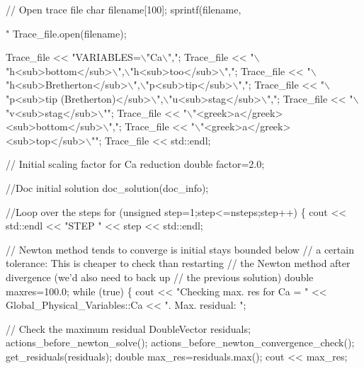 \begin{DoxyCodeInclude}
{{ \textcolor{comment}{// Open trace file}
 \textcolor{keywordtype}{char} filename[100];   
 sprintf(filename,\textcolor{stringliteral}{"%
 Trace\_file.open(filename);

 Trace\_file << \textcolor{stringliteral}{"VARIABLES=\(\backslash\)"Ca\(\backslash\)","};
 Trace\_file << \textcolor{stringliteral}{"\(\backslash\)"h<sub>bottom</sub>\(\backslash\)",\(\backslash\)"h<sub>too</sub>\(\backslash\)","};
 Trace\_file << \textcolor{stringliteral}{"\(\backslash\)"h<sub>Bretherton</sub>\(\backslash\)",\(\backslash\)"p<sub>tip</sub>\(\backslash\)","};
 Trace\_file << \textcolor{stringliteral}{"\(\backslash\)"p<sub>tip (Bretherton)</sub>\(\backslash\)",\(\backslash\)"u<sub>stag</sub>\(\backslash\)","};
 Trace\_file << \textcolor{stringliteral}{"\(\backslash\)"v<sub>stag</sub>\(\backslash\)""};
 Trace\_file << \textcolor{stringliteral}{"\(\backslash\)"<greek>a</greek><sub>bottom</sub>\(\backslash\)","};
 Trace\_file << \textcolor{stringliteral}{"\(\backslash\)"<greek>a</greek><sub>top</sub>\(\backslash\)""};
 Trace\_file << std::endl;

 \textcolor{comment}{// Initial scaling factor for Ca reduction}
 \textcolor{keywordtype}{double} factor=2.0;

 \textcolor{comment}{//Doc initial solution}
 doc\_solution(doc\_info);

\textcolor{comment}{//Loop over the steps}
 \textcolor{keywordflow}{for} (\textcolor{keywordtype}{unsigned} step=1;step<=nsteps;step++)
  \{
   cout << std::endl << \textcolor{stringliteral}{"STEP "} << step << std::endl;

   \textcolor{comment}{// Newton method tends to converge is initial stays bounded below}
   \textcolor{comment}{// a certain tolerance: This is cheaper to check than restarting}
   \textcolor{comment}{// the Newton method after divergence (we'd also need to back up}
   \textcolor{comment}{// the previous solution)}
   \textcolor{keywordtype}{double} maxres=100.0;
   \textcolor{keywordflow}{while} (\textcolor{keyword}{true})
    \{
     cout << \textcolor{stringliteral}{"Checking max. res for Ca = "} 
          << Global\_Physical\_Variables::Ca << \textcolor{stringliteral}{".   Max. residual: "};

     \textcolor{comment}{// Check the maximum residual}
     DoubleVector residuals;
     actions\_before\_newton\_solve();
     actions\_before\_newton\_convergence\_check();
     get\_residuals(residuals);
     \textcolor{keywordtype}{double} max\_res=residuals.max();
     cout << max\_res;

}}}
\end{DoxyCodeInclude}
